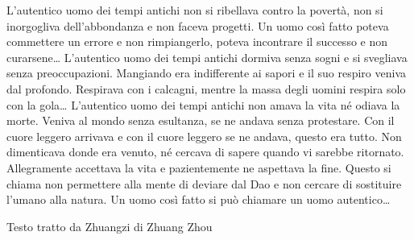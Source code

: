 \documentclass[12pt]{book} %
\begin{document}
\begin{mdframed}[linewidth=1pt]
L’autentico uomo dei tempi antichi non si ribellava contro la povertà, non si inorgogliva dell’abbondanza e non faceva progetti. Un uomo così fatto poteva commettere un errore e non rimpiangerlo, poteva incontrare il successo e non curarsene… L’autentico uomo dei tempi antichi dormiva senza sogni e si svegliava senza preoccupazioni. Mangiando era indifferente ai sapori e il suo respiro veniva dal profondo. Respirava con i calcagni, mentre la massa degli uomini respira solo con la gola… L’autentico uomo dei tempi antichi non amava la vita né odiava la morte. Veniva al mondo senza esultanza, se ne andava senza protestare. Con il cuore leggero arrivava e con il cuore leggero se ne andava, questo era tutto. Non dimenticava donde era venuto, né cercava di sapere quando vi sarebbe ritornato. Allegramente accettava la vita e pazientemente ne aspettava la fine. Questo si chiama non permettere alla mente di deviare dal Dao e non cercare di sostituire l’umano alla natura. Un uomo così fatto si può chiamare un uomo autentico…

Testo tratto da Zhuangzi di Zhuang Zhou 
\end{mdframed}
\end{document}
